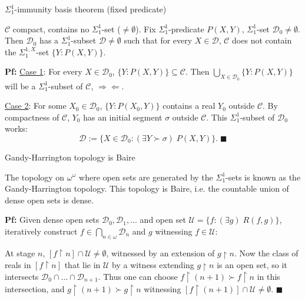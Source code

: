 \begin{frame}{$\Sigma_1^{1}$-immunity basis theorem (fixed predicate)}
  \begin{lemma*}
    $\mathcal{C}$ compact, contains no $\Sigma_1^{1}$-set
    ($\neq\emptyset$). Fix $\Sigma_1^{1}$-predicate $P(X,Y)$,
    $\Sigma_1^{1}$-set $\mathcal{D}_0\neq\emptyset$. Then
    $\mathcal{D}_0$ has a $\Sigma_1^{1}$-subset
    $\mathcal{D}\neq\emptyset$ such that for every $X\in\mathcal{D}$,
    $\mathcal{C}$ does not contain the $\Sigma_1^{1,X}$-set
    $\{Y:P(X,Y)\}$.
  \end{lemma*}

  \vspace{1em}
  \textbf{Pf:} \underline{Case 1}: For every $X\in\mathcal{D}_0$,
  $\{Y:P(X,Y)\}\subseteq\mathcal{C}$. Then $\bigcup_{X\in\mathcal{D}_0}
  \{Y:P(X,Y)\}$ will be a $\Sigma_1^{1}$-subset of $\mathcal{C}$,
  $\Rightarrow\Leftarrow$.

  \vspace{1em}
  \underline{Case 2}: For some $X_0\in\mathcal{D}_0$, $\{Y:P(X_0,Y)\}$
  contains a real $Y_0$ outside $\mathcal{C}$. By compactness of
  $\mathcal{C}$, $Y_0$ has an initial segment $\sigma$ outside
  $\mathcal{C}$. This $\Sigma_1^{1}$-subset of $\mathcal{D}_0$ works:
  \[\mathcal{D}:= \{X\in\mathcal{D}_0: (\exists Y\succ\sigma)\; P(X,Y)\}.\;
  \blacksquare\]
\end{frame}

\begin{frame}{Gandy-Harrington topology is Baire}
  \begin{thm*}
    The topology on $\omega^\omega$ where open sets are generated by the
    $\Sigma_1^{1}$-sets is known as the Gandy-Harrington topology. This
    topology is Baire, i.e. the countable union of dense open sets is
    dense.
  \end{thm*}

  \vspace{1em}
  \textbf{Pf:} Given dense open sets $\mathcal{D}_0,\mathcal{D}_1,\ldots$
  and open set $\mathcal{U}=\{f:(\exists g)\; R(f,g)\}$, iteratively
  construct $f\in\bigcap_{n\in\omega}\mathcal{D}_n$ and $g$ witnessing
  $f\in\mathcal{U}$:
  
  \vspace{1em}
  At stage $n$, $[f\restriction n]\cap\mathcal{U} \neq\emptyset$, witnessed
  by an extension of $g\restriction n$. Now the class of reals in
  $[f\restriction n]$ that lie in $\mathcal{U}$ by a witness extending
  $g\restriction n$ is an open set, so it intersects
  $\mathcal{D}_0\cap\ldots\cap\mathcal{D}_{n+1}$. Thus one can choose
  $f\restriction (n+1) \succ f\restriction n$ in this intersection, and
  $g\restriction (n+1) \succ g\restriction n$ witnessing $[f\restriction
  (n+1)]\cap\mathcal{U} \neq\emptyset$. $\blacksquare$
\end{frame}

